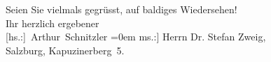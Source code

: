 \pstart
           Seien Sie vielmals gegrüsst, auf baldiges Wiedersehen!{\\[\baselineskip]}Ihr herzlich ergebener{\\[\baselineskip]}\spacefill\mbox{{[}hs.:{]} Arthur Schnitzler}\pend
           \leftskip=0em{}
\pstart
           \noindent{}{[}ms.:{]} Herrn Dr. Stefan Zweig,{\\}Salzburg, Kapuzinerberg 5.\pend
           \endnumbering{}  \newcommand{\dateiname}{L03753}\newcommand{\titel}{Arthur Schnitzler an Stefan Zweig, 22. 1. 1923}\newcommand{\editorInnen}{Selma Jahnke und Martin Anton Müller}
